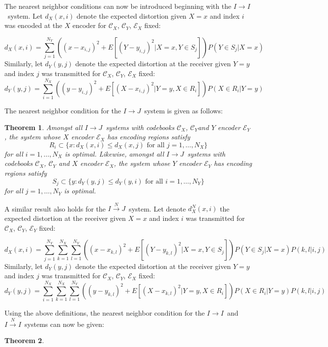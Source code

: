 \documentclass[10pt]{article}
\newtheorem{theorem}{Theorem}[section]
\newcommand{\sysIIN}{\mbox{$I \overset{N}{\rightarrow} I$}}
\newcommand{\sysII}{\mbox{$I \rightarrow I$}}
\newcommand{\sysIJN}{\mbox{$I \overset{N}{\rightarrow} J$}}
\newcommand{\sysIJ}{\mbox{$I \rightarrow J$}}
\begin{document}
The nearest neighbor conditions can now be introduced beginning with the \sysII\ system. Let $d_X(x,i)$ denote the expected distortion given $X=x$ and index $i$ was encoded at the $X$ encoder for $\mathcal{C}_X$, $\mathcal{C}_Y$, $\mathcal{E}_X$ fixed:

\begin{equation}
d_X(x,i)= \sum_{j=1}^{N_Y} ( {(x-x_{i,j})}^2 + E[{(Y-y_{i,j})}^2|X=x,Y\in S_j])P(Y \in S_j|X=x) \end{equation}
Similarly, let $d_Y(y,j)$ denote the expected distortion at the receiver given $Y=y$ and index $j$ was transmitted for $\mathcal{C}_X$, $\mathcal{C}_Y$, $\mathcal{E}_X$ fixed:
\begin{equation}
d_Y(y,j)= \sum_{i=1}^{N_X} ( {(y-y_{i,j})}^2 + E[{(X-x_{i,j})}^2|Y=y,X\in R_i])P(X \in R_i|Y=y) \end{equation}

The nearest neighbor condition for the \sysIJ\ system is given as follows:

\begin{theorem}
Amongst all \sysIJ\ systems with codebooks $\mathcal{C}_X$, $\mathcal{C}_Y$and $Y$ encoder $\mathcal{E}_Y$, the system whose $X$ encoder $\mathcal{E}_X$ has encoding regions satisfy
\begin{equation}
R_i \subset \{ x : d_X(x,i) \le d_X(x,j) \text{ for all } j=1,\ldots,N_X \}
\end{equation}
for all $i=1,\ldots,N_X$ is optimal. Likewise, amongst all \sysIJ\ systems with codebooks $\mathcal{C}_X$, $\mathcal{C}_Y$ and $X$ encoder $\mathcal{E}_X$, the system whose $Y$ encoder $\mathcal{E}_Y$ has encoding regions satisfy
\begin{equation}
S_j \subset \{ y : d_Y(y,j) \le d_Y(y,i) \text{ for all } i=1,\ldots,N_Y \}
\end{equation}
for all $j=1,\ldots,N_Y$ is optimal.
\end{theorem}

A similar result also holds for the \sysIJN\ system. Let denote $d_X^N(x,i)$ the expected distortion at the receiver given $X=x$ and index $i$ was transmitted for $\mathcal{C}_X$, $\mathcal{C}_Y$, $\mathcal{E}_Y$ fixed:

\begin{equation}
d_X(x,i)= \sum_{j=1}^{N_Y} \sum_{k=1}^{N_X} \sum_{l=1}^{N_Y} ( {(x-x_{k,l})}^2 + E[{(Y-y_{k,l})}^2|X=x,Y\in S_j])P(Y \in S_j|X=x) P(k,l|i,j)
\end{equation}
Similarly, let $d_Y(y,j)$ denote the expected distortion at the receiver given $Y=y$ and index $j$ was transmitted for $\mathcal{C}_X$, $\mathcal{C}_Y$, $\mathcal{E}_X$ fixed:
\begin{equation}
d_Y(y,j)= \sum_{i=1}^{N_X} \sum_{k=1}^{N_X} \sum_{l=1}^{N_Y} ( {(y-y_{k,l})}^2 + E[{(X-x_{k,l})}^2|Y=y,X\in R_i])P(X \in R_i|Y=y) P(k,l|i,j)
\end{equation}

Using the above definitions, the nearest neighbor condition for the \sysII\ and \sysIIN\ systems can now be given:

\begin{theorem}

\end{theorem}
\end{document}
